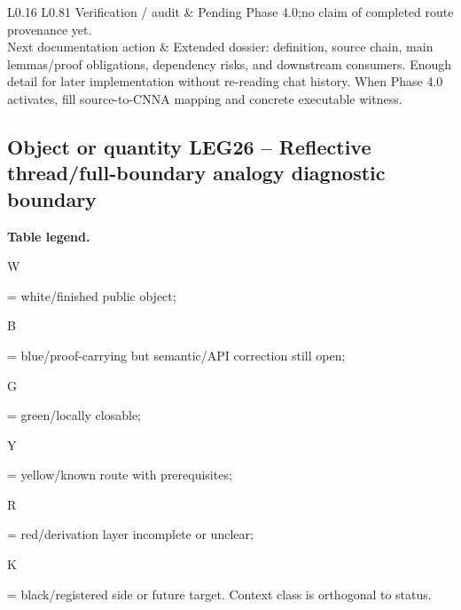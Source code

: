 \begin{longtable}{L{0.16\linewidth} L{0.81\linewidth}}
\hline\addlinespace[0.20em]
Verification /\allowbreak{} audit & Pending Phase 4.0;\newline no claim of completed route provenance yet.\\
\hline\addlinespace[0.20em]
Next documentation action & Extended dossier: definition, source chain, main lemmas/\allowbreak{}proof obligations, dependency risks, and downstream consumers. Enough detail for later implementation without re-reading chat history. When Phase 4.0 activates, fill source-to-CNNA mapping and concrete executable witness.\\
\hline\addlinespace[0.20em]
\end{longtable}
\subsection*{Object or quantity LEG26 -- Reflective thread/\allowbreak{}full-boundary analogy diagnostic boundary}
\hypertarget{objproof:LEG26}{}
\par\smallskip\noindent\begin{minipage}{0.99\linewidth}\footnotesize\raggedright\textbf{Table legend.} \colorbox{white}{\strut W} = white/finished public object; \colorbox{cyan!20}{\strut B} = blue/proof-carrying but semantic/API correction still open; \colorbox{green!18}{\strut G} = green/locally closable; \colorbox{yellow!25}{\strut Y} = yellow/known route with prerequisites; \colorbox{red!20}{\strut R} = red/derivation layer incomplete or unclear; \colorbox{black!18}{\strut K} = black/registered side or future target. Context class is orthogonal to status.\end{minipage}\par\vspace{0.25em}
